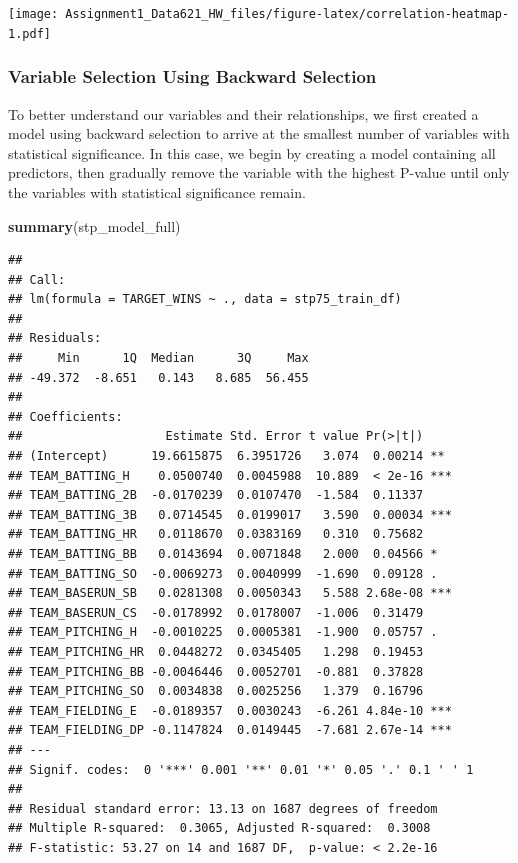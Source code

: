 \documentclass[
]{article}
\newenvironment{Shaded}{\begin{snugshade}}{\end{snugshade}}
\newcommand{\FunctionTok}[1]{\textcolor[rgb]{0.13,0.29,0.53}{\textbf{#1}}}
\newcommand{\NormalTok}[1]{#1}
\begin{document}
\texttt{[image: Assignment1\_Data621\_HW\_files/figure-latex/correlation-heatmap-1.pdf]}

\subsubsection{Variable Selection Using Backward
Selection}\label{variable-selection-using-backward-selection}

To better understand our variables and their relationships, we first
created a model using backward selection to arrive at the smallest
number of variables with statistical significance. In this case, we
begin by creating a model containing all predictors, then gradually
remove the variable with the highest P-value until only the variables
with statistical significance remain.

\begin{Shaded}
\begin{Highlighting}[]
\FunctionTok{summary}\NormalTok{(stp\_model\_full)}
\end{Highlighting}
\end{Shaded}

\begin{verbatim}
## 
## Call:
## lm(formula = TARGET_WINS ~ ., data = stp75_train_df)
## 
## Residuals:
##     Min      1Q  Median      3Q     Max 
## -49.372  -8.651   0.143   8.685  56.455 
## 
## Coefficients:
##                    Estimate Std. Error t value Pr(>|t|)    
## (Intercept)      19.6615875  6.3951726   3.074  0.00214 ** 
## TEAM_BATTING_H    0.0500740  0.0045988  10.889  < 2e-16 ***
## TEAM_BATTING_2B  -0.0170239  0.0107470  -1.584  0.11337    
## TEAM_BATTING_3B   0.0714545  0.0199017   3.590  0.00034 ***
## TEAM_BATTING_HR   0.0118670  0.0383169   0.310  0.75682    
## TEAM_BATTING_BB   0.0143694  0.0071848   2.000  0.04566 *  
## TEAM_BATTING_SO  -0.0069273  0.0040999  -1.690  0.09128 .  
## TEAM_BASERUN_SB   0.0281308  0.0050343   5.588 2.68e-08 ***
## TEAM_BASERUN_CS  -0.0178992  0.0178007  -1.006  0.31479    
## TEAM_PITCHING_H  -0.0010225  0.0005381  -1.900  0.05757 .  
## TEAM_PITCHING_HR  0.0448272  0.0345405   1.298  0.19453    
## TEAM_PITCHING_BB -0.0046446  0.0052701  -0.881  0.37828    
## TEAM_PITCHING_SO  0.0034838  0.0025256   1.379  0.16796    
## TEAM_FIELDING_E  -0.0189357  0.0030243  -6.261 4.84e-10 ***
## TEAM_FIELDING_DP -0.1147824  0.0149445  -7.681 2.67e-14 ***
## ---
## Signif. codes:  0 '***' 0.001 '**' 0.01 '*' 0.05 '.' 0.1 ' ' 1
## 
## Residual standard error: 13.13 on 1687 degrees of freedom
## Multiple R-squared:  0.3065, Adjusted R-squared:  0.3008 
## F-statistic: 53.27 on 14 and 1687 DF,  p-value: < 2.2e-16
\end{verbatim}
\end{document}
